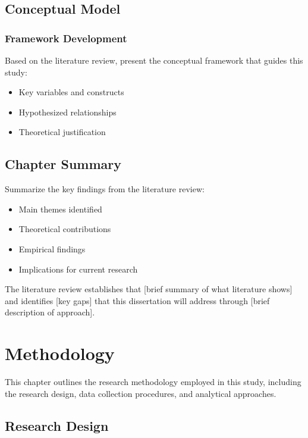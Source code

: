 \documentclass[
  12pt,
  letterpaper,
  12pt,
  letterpaper,
  oneside]{report}
\providecommand{\tightlist}{%
  \setlength{\itemsep}{0pt}\setlength{\parskip}{0pt}}
\begin{document}
\section{Conceptual Model}\label{conceptual-model}

\subsection{Framework Development}\label{framework-development}

Based on the literature review, present the conceptual framework that
guides this study:

\begin{itemize}
\tightlist
\item
  Key variables and constructs
\item
  Hypothesized relationships
\item
  Theoretical justification
\end{itemize}

\section{Chapter Summary}\label{chapter-summary}

Summarize the key findings from the literature review:

\begin{itemize}
\tightlist
\item
  Main themes identified
\item
  Theoretical contributions
\item
  Empirical findings
\item
  Implications for current research
\end{itemize}

The literature review establishes that {[}brief summary of what
literature shows{]} and identifies {[}key gaps{]} that this dissertation
will address through {[}brief description of approach{]}.


\chapter{Methodology}\label{methodology}

This chapter outlines the research methodology employed in this study,
including the research design, data collection procedures, and
analytical approaches.

\section{Research Design}\label{research-design}
\end{document}
